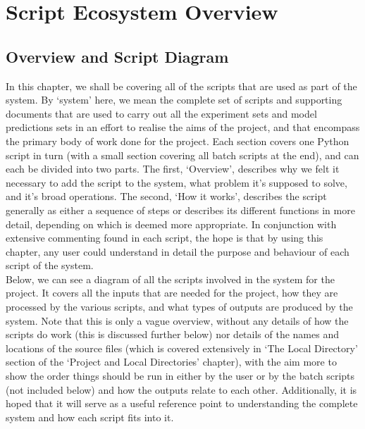 \documentclass[12pt,twoside]{report}
\begin{document}
\chapter{Script Ecosystem Overview}

\section{Overview and Script Diagram}

\quad In this chapter, we shall be covering all of the scripts that are used as part of the system. By ‘system’ here, we mean the complete set of scripts and supporting documents that are used to carry out all the experiment sets and model predictions sets in an effort to realise the aims of the project, and that encompass the primary body of work done for the project. Each section covers one Python script in turn (with a small section covering all batch scripts at the end), and can each be divided into two parts. The first, ‘Overview’, describes why we felt it necessary to add the script to the system, what problem it’s supposed to solve, and it’s broad operations. The second, ‘How it works’, describes the script generally as either a sequence of steps or describes its different functions in more detail, depending on which is deemed more appropriate. In conjunction with extensive commenting found in each script, the hope is that by using this chapter, any user could understand in detail the purpose and behaviour of each script of the system.\\

\quad Below, we can see a diagram of all the scripts involved in the system for the project. It covers all the inputs that are needed for the project, how they are processed by the various scripts, and what types of outputs are produced by the system. Note that this is only a vague overview, without any details of how the scripts do work (this is discussed further below) nor details of the names and locations of the source files (which is covered extensively in ‘The Local Directory’ section of the ‘Project and Local Directories’ chapter), with the aim more to show the order things should be run in either by the user or by the batch scripts (not included below) and how the outputs relate to each other. Additionally, it is hoped that it will serve as a useful reference point to understanding the complete system and how each script fits into it.
\end{document}
